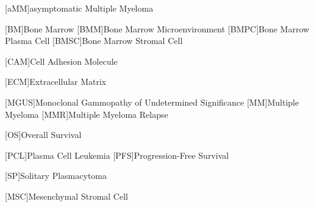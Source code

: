 
\label{sec:Abbreviations}



\begin{acronym}
    [aMM]{asymptomatic Multiple Myeloma}

    [BM]{Bone Marrow}
    [BMM]{Bone Marrow Microenvironment}
    [BMPC]{Bone Marrow Plasma Cell}
    [BMSC]{Bone Marrow Stromal Cell}

    [CAM]{Cell Adhesion Molecule}

    [ECM]{Extracellular Matrix}

    [MGUS]{Monoclonal Gammopathy of Undetermined Significance}
    [MM]{Multiple Myeloma}
    [MMR]{Multiple Myeloma Relapse}

    [OS]{Overall Survival}

    [PCL]{Plasma Cell Leukemia}
    [PFS]{Progression-Free Survival}

    [SP]{Solitary Plasmacytoma}

    [MSC]{Mesenchymal Stromal Cell}
    
    
\end{acronym}